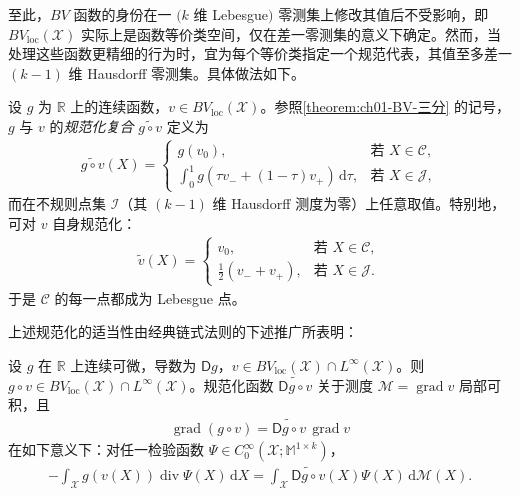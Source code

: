 \documentclass[../../main.tex]{subfiles}
\begin{document}
至此，$BV$ 函数的身份在一 $(k$ 维 Lebesgue$)$ 零测集上修改其值后不受影响，即 $BV_{\mathrm{loc}}(\mathscr{X})$ 实际上是函数等价类空间，仅在差一零测集的意义下确定。然而，当处理这些函数更精细的行为时，宜为每个等价类指定一个规范代表，其值至多差一 $(k-1)$ 维 Hausdorff 零测集。具体做法如下。

设 $g$ 为 $\mathbb{R}$ 上的连续函数，$v\in BV_{\mathrm{loc}}(\mathscr{X})$。参照\cref{theorem:ch01-BV-三分} 的记号，$g$ 与 $v$ 的\emph{规范化复合} $\widetilde{g\circ v}$ 定义为
\begin{align}
\widetilde{g\circ v}(X)=
\begin{cases}
g(v_{0}), & \text{若 }X\in\mathscr{C},\\[1mm]
\displaystyle\int_{0}^{1}g(\tau v_{-}+(1-\tau)v_{+})\,\mathrm{d}\tau, & \text{若 }X\in\mathscr{J},
\end{cases}\label{align:ch01-normalized-composition}
\end{align}
而在不规则点集 $\mathscr{I}$（其 $(k-1)$ 维 Hausdorff 测度为零）上任意取值。特别地，可对 $v$ 自身规范化：
\begin{align}
\tilde{v}(X)=
\begin{cases}
v_{0}, & \text{若 }X\in\mathscr{C},\\[1mm]
\frac{1}{2}(v_{-}+v_{+}), & \text{若 }X\in\mathscr{J}.
\end{cases}\label{align:ch01-normalized-v}
\end{align}
于是 $\mathscr{C}$ 的每一点都成为 Lebesgue 点。

上述规范化的适当性由经典链式法则的下述推广所表明：

\begin{theorem}\label{theorem:ch01-BV链式法则}
设 $g$ 在 $\mathbb{R}$ 上连续可微，导数为 $\mathsf{D}g$，$v\in BV_{\mathrm{loc}}(\mathscr{X})\cap L^{\infty}(\mathscr{X})$。则 $g\circ v\in BV_{\mathrm{loc}}(\mathscr{X})\cap L^{\infty}(\mathscr{X})$。规范化函数 $\widetilde{\mathsf{D}g\circ v}$ 关于测度 $\mathscr{M}=\operatorname{grad}v$ 局部可积，且
\begin{align}
\operatorname{grad}(g\circ v)=\widetilde{\mathsf{D}g\circ v}\,\operatorname{grad}v\label{align:ch01-chain-rule}
\end{align}
在如下意义下：对任一检验函数 $\Psi\in C_{0}^{\infty}(\mathscr{X};\mathbb{M}^{1\times k})$，
\begin{align}
-\int_{\mathscr{X}}g(v(X))\operatorname{div}\Psi(X)\,\mathrm{d}X=\int_{\mathscr{X}}\widetilde{\mathsf{D}g\circ v}(X)\Psi(X)\,\mathrm{d}\mathscr{M}(X).\label{align:ch01-chain-rule-weak}
\end{align}
\end{theorem}
\end{document}
